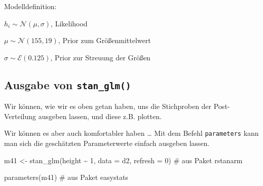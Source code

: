 \documentclass[
  a4paper,
  DIV=11]{scrreprt}
\newenvironment{Shaded}{\begin{snugshade}}{\end{snugshade}}
\newcommand{\AttributeTok}[1]{\textcolor[rgb]{0.40,0.45,0.13}{#1}}
\newcommand{\CommentTok}[1]{\textcolor[rgb]{0.37,0.37,0.37}{#1}}
\newcommand{\DecValTok}[1]{\textcolor[rgb]{0.68,0.00,0.00}{#1}}
\newcommand{\FunctionTok}[1]{\textcolor[rgb]{0.28,0.35,0.67}{#1}}
\newcommand{\NormalTok}[1]{\textcolor[rgb]{0.00,0.23,0.31}{#1}}
\newcommand{\OtherTok}[1]{\textcolor[rgb]{0.00,0.23,0.31}{#1}}
\newcommand{\SpecialCharTok}[1]{\textcolor[rgb]{0.37,0.37,0.37}{#1}}
\theoremstyle{definition}
\theoremstyle{remark}
\begin{document}
Modelldefinition:

\(h_i \sim \mathcal{N}(\mu, \sigma)\), Likelihood

\(\mu \sim \mathcal{N}(155, 19)\), Prior zum Größenmittelwert

\(\sigma \sim \mathcal{E}(0.125)\), Prior zur Streuung der Größen

\hypertarget{ausgabe-von-stan_glm}{%
\subsection{\texorpdfstring{Ausgabe von
\texttt{stan\_glm()}}{Ausgabe von stan\_glm()}}\label{ausgabe-von-stan_glm}}

Wir können, wie wir es oben getan haben, uns die Stichproben der
Post-Verteilung ausgeben lassen, und diese z.B. plotten.

Wir können es aber auch komfortabler haben \ldots{} Mit dem Befehl
\texttt{parameters} kann man sich die geschätzten Parameterwerte einfach
ausgeben lassen.

\begin{Shaded}
\begin{Highlighting}[]
\NormalTok{m41 }\OtherTok{\textless{}{-}} \FunctionTok{stan\_glm}\NormalTok{(height }\SpecialCharTok{\textasciitilde{}} \DecValTok{1}\NormalTok{, }\AttributeTok{data =}\NormalTok{ d2, }\AttributeTok{refresh =} \DecValTok{0}\NormalTok{)  }\CommentTok{\# aus Paket rstanarm}

\FunctionTok{parameters}\NormalTok{(m41)  }\CommentTok{\# aus Paket \textasciigrave{}easystats\textasciigrave{}}
\end{Highlighting}
\end{Shaded}
\end{document}
